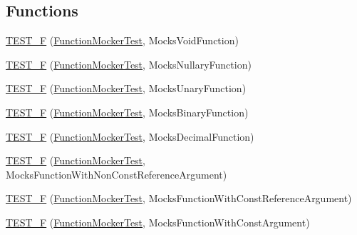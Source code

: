 \subsection*{Functions}
\begin{DoxyCompactItemize}
\item 
\hyperlink{namespacetesting_1_1gmock__generated__function__mockers__test_aee64a5117451830331c321aecd10025f}{T\+E\+S\+T\+\_\+F} (\hyperlink{classtesting_1_1gmock__generated__function__mockers__test_1_1FunctionMockerTest}{Function\+Mocker\+Test}, Mocks\+Void\+Function)
\item 
\hyperlink{namespacetesting_1_1gmock__generated__function__mockers__test_a0a1348d6814b9bc02ad5b2ac46361ac0}{T\+E\+S\+T\+\_\+F} (\hyperlink{classtesting_1_1gmock__generated__function__mockers__test_1_1FunctionMockerTest}{Function\+Mocker\+Test}, Mocks\+Nullary\+Function)
\item 
\hyperlink{namespacetesting_1_1gmock__generated__function__mockers__test_a835348f70c0335c9213153f72138d12f}{T\+E\+S\+T\+\_\+F} (\hyperlink{classtesting_1_1gmock__generated__function__mockers__test_1_1FunctionMockerTest}{Function\+Mocker\+Test}, Mocks\+Unary\+Function)
\item 
\hyperlink{namespacetesting_1_1gmock__generated__function__mockers__test_aa8d2e25f60ad3ac49736ee90fb7ac190}{T\+E\+S\+T\+\_\+F} (\hyperlink{classtesting_1_1gmock__generated__function__mockers__test_1_1FunctionMockerTest}{Function\+Mocker\+Test}, Mocks\+Binary\+Function)
\item 
\hyperlink{namespacetesting_1_1gmock__generated__function__mockers__test_a279ba48bf6f937eecfc12530b9dde497}{T\+E\+S\+T\+\_\+F} (\hyperlink{classtesting_1_1gmock__generated__function__mockers__test_1_1FunctionMockerTest}{Function\+Mocker\+Test}, Mocks\+Decimal\+Function)
\item 
\hyperlink{namespacetesting_1_1gmock__generated__function__mockers__test_a852587f21316c0341b60b29d44cd61ea}{T\+E\+S\+T\+\_\+F} (\hyperlink{classtesting_1_1gmock__generated__function__mockers__test_1_1FunctionMockerTest}{Function\+Mocker\+Test}, Mocks\+Function\+With\+Non\+Const\+Reference\+Argument)
\item 
\hyperlink{namespacetesting_1_1gmock__generated__function__mockers__test_a5367aba117b37aff1ceb4be3d4732559}{T\+E\+S\+T\+\_\+F} (\hyperlink{classtesting_1_1gmock__generated__function__mockers__test_1_1FunctionMockerTest}{Function\+Mocker\+Test}, Mocks\+Function\+With\+Const\+Reference\+Argument)
\item 
\hyperlink{namespacetesting_1_1gmock__generated__function__mockers__test_a957ee1afed65097f1c25790f266ec91e}{T\+E\+S\+T\+\_\+F} (\hyperlink{classtesting_1_1gmock__generated__function__mockers__test_1_1FunctionMockerTest}{Function\+Mocker\+Test}, Mocks\+Function\+With\+Const\+Argument)

\end{DoxyCompactItemize}
